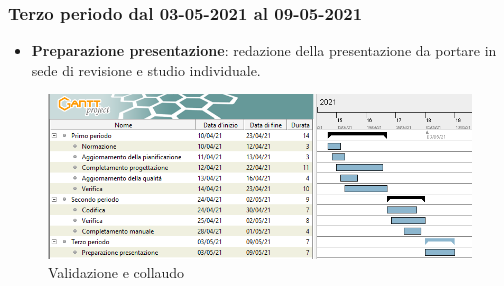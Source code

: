 	\subsubsection{Terzo periodo dal 03-05-2021 al 09-05-2021}
	\begin{itemize}
		\item \textbf{Preparazione presentazione}: redazione della presentazione da portare in sede di revisione e
		studio individuale.
	\end{itemize}
	
	\newpage
	\begin{landscape}
		\begin{figure}[h!]
			\includegraphics[width=24cm]{images/5_Validazione_e_collaudo.png}
			\caption{Validazione e collaudo}
		\end{figure}
	\end{landscape}
